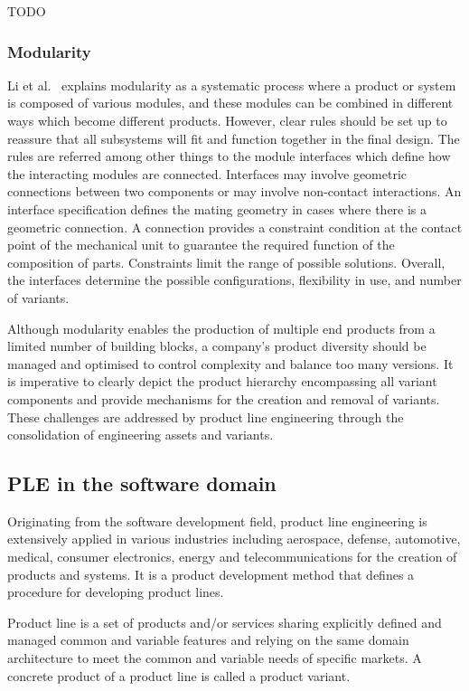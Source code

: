 \documentclass[sigconf,review]{acmart}
\begin{document}
TODO

\subsubsection{Modularity}

Li et al.~\cite{Li_2019} explains modularity as a systematic process where a product or system is composed of various modules, and these modules can be combined in different ways which become different products. 
However, clear rules should be set up to reassure that all subsystems will fit and function together in the final design.
The rules are referred among other things to the module interfaces which define how the interacting modules are connected.
Interfaces may involve geometric connections between two components or may involve non-contact interactions. An interface specification defines the mating geometry in cases where there is a geometric connection.
A connection provides a constraint condition at the contact point of the mechanical unit to guarantee the required function of the composition of parts.
Constraints limit the range of possible solutions.
Overall, the interfaces determine the possible configurations, flexibility in use, and number of variants. 

Although modularity enables the production of  multiple end products from a limited number of building blocks, a company's product diversity should be managed and optimised to control complexity and balance too many versions. 
It is imperative to clearly depict the product hierarchy encompassing all variant components and provide mechanisms for the creation and removal of variants. 
These challenges are addressed by product line engineering through the consolidation of engineering assets and variants.

\subsection{PLE in the software domain}
\label{sec:product line engineering}

Originating from the software development field, product line engineering is extensively applied in various industries including aerospace, defense, automotive, medical, consumer electronics, energy and telecommunications for the creation of products and systems. 
It is a product development method that defines a procedure for developing product lines. 

Product line is a set of products and/or services sharing explicitly defined and managed common and variable features and relying on the same domain architecture to meet the common and variable needs of specific markets.
A concrete product of a product line is called a product variant.
\end{document}
